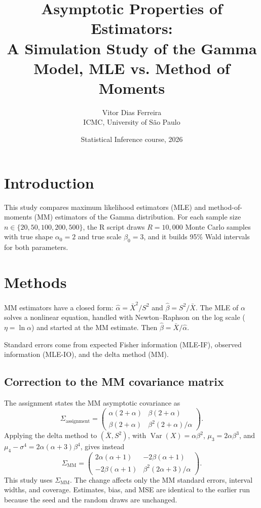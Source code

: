 \documentclass[11pt,a4paper]{article}
\title{Asymptotic Properties of Estimators:\\ A Simulation Study of the Gamma Model, MLE vs. Method of Moments}
\author{Vitor Dias Ferreira\\ICMC, University of S\~ao Paulo}
\date{Statistical Inference course, 2026}
\begin{document}
\maketitle
\section{Introduction}
This study compares maximum likelihood estimators (MLE) and method-of-moments (MM) estimators of the Gamma distribution. For each sample size $n \in \{20, 50, 100, 200, 500\}$, the R script draws $R = 10{,}000$ Monte Carlo samples with true shape $\alpha_0 = 2$ and true scale $\beta_0 = 3$, and it builds 95\% Wald intervals for both parameters.

\section{Methods}
MM estimators have a closed form: $\hat\alpha = \bar X^2 / S^2$ and $\hat\beta = S^2 / \bar X$. The MLE of $\alpha$ solves a nonlinear equation, handled with Newton--Raphson on the log scale ($\eta = \ln\alpha$) and started at the MM estimate. Then $\hat\beta = \bar X / \hat\alpha$.

Standard errors come from expected Fisher information (MLE-IF), observed information (MLE-IO), and the delta method (MM).

\subsection{Correction to the MM covariance matrix}
The assignment states the MM asymptotic covariance as
\[
\Sigma_{\text{assignment}} = \begin{pmatrix} \alpha(2+\alpha) & \beta(2+\alpha) \\ \beta(2+\alpha) & \beta^2(2+\alpha)/\alpha \end{pmatrix}.
\]
Applying the delta method to $(\bar X, S^2)$, with $\operatorname{Var}(X) = \alpha\beta^2$, $\mu_3 = 2\alpha\beta^3$, and $\mu_4 - \sigma^4 = 2\alpha(\alpha+3)\beta^4$, gives instead
\[
\Sigma_{\text{MM}} = \begin{pmatrix} 2\alpha(\alpha+1) & -2\beta(\alpha+1) \\ -2\beta(\alpha+1) & \beta^2(2\alpha+3)/\alpha \end{pmatrix}.
\]
This study uses $\Sigma_{\text{MM}}$. The change affects only the MM standard errors, interval widths, and coverage. Estimates, bias, and MSE are identical to the earlier run because the seed and the random draws are unchanged.
\end{document}
